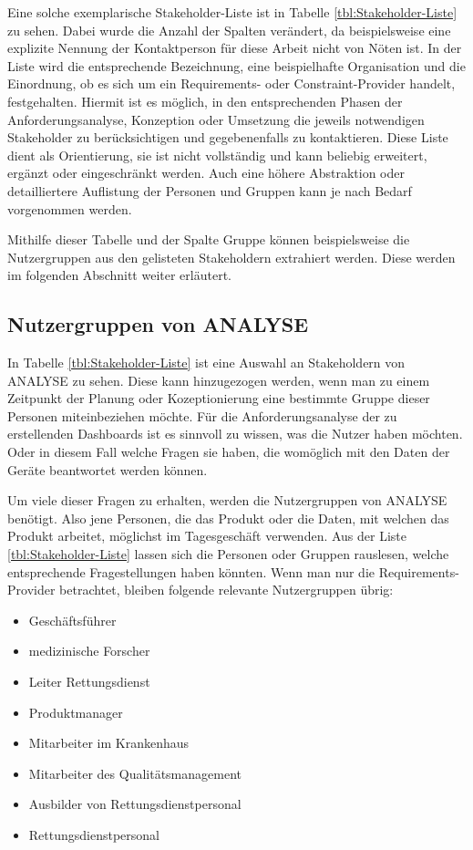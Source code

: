 Eine solche exemplarische Stakeholder-Liste ist in Tabelle \ref{tbl:Stakeholder-Liste} zu sehen.
Dabei wurde die Anzahl der Spalten verändert, da beispielsweise eine explizite Nennung der Kontaktperson für diese Arbeit nicht von Nöten ist.
In der Liste wird die entsprechende Bezeichnung, eine beispielhafte Organisation und die Einordnung, ob es sich um ein Requirements- oder Constraint-Provider handelt, festgehalten.
Hiermit ist es möglich, in den entsprechenden Phasen der Anforderungsanalyse, Konzeption oder Umsetzung die jeweils notwendigen Stakeholder zu berücksichtigen und gegebenenfalls zu kontaktieren. 
Diese Liste dient als Orientierung, sie ist nicht vollständig und kann beliebig erweitert, ergänzt oder eingeschränkt werden.
Auch eine höhere Abstraktion oder detailliertere Auflistung der Personen und Gruppen kann je nach Bedarf vorgenommen werden. 

Mithilfe dieser Tabelle und der Spalte \glqq Gruppe\grqq{} können beispielsweise die Nutzergruppen aus den gelisteten Stakeholdern extrahiert werden.
Diese werden im folgenden Abschnitt weiter erläutert.

\subsection{Nutzergruppen von \acrlong*{ANALYSE}}
\label{sub:NutzergruppenAnalyse}
In Tabelle \ref{tbl:Stakeholder-Liste} ist eine Auswahl an Stakeholdern von \gls{ANALYSE} zu sehen.
Diese kann hinzugezogen werden, wenn man zu einem Zeitpunkt der Planung oder Kozeptionierung eine bestimmte Gruppe dieser Personen miteinbeziehen möchte.
Für die Anforderungsanalyse der zu erstellenden \gls{Dashboard}s ist es sinnvoll zu wissen, was die Nutzer haben möchten.
Oder in diesem Fall welche Fragen sie haben, die womöglich mit den Daten der Geräte beantwortet werden können.

Um viele dieser Fragen zu erhalten, werden die Nutzergruppen von \gls{ANALYSE} benötigt.
Also jene Personen, die das Produkt oder die Daten, mit welchen das Produkt arbeitet, möglichst im Tagesgeschäft verwenden.
Aus der Liste \ref{tbl:Stakeholder-Liste} lassen sich die Personen oder Gruppen rauslesen, welche entsprechende Fragestellungen haben könnten. 
Wenn man nur die Requirements-Provider betrachtet, bleiben folgende relevante Nutzergruppen übrig:
\begin{multicols}{2}
\begin{itemize}
\item Geschäftsführer
\item medizinische Forscher
\item Leiter Rettungsdienst
\item Produktmanager
\item Mitarbeiter im Krankenhaus
\item Mitarbeiter des Qualitätsmanagement
\item Ausbilder von Rettungsdienstpersonal
\item Rettungsdienstpersonal
\end{itemize}
\end{multicols}

